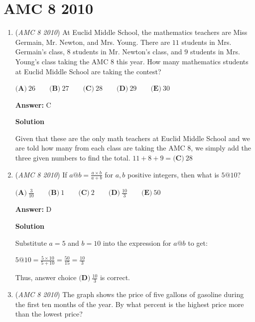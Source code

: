 \section{AMC 8 2010}
        \begin{enumerate}
        	\item (\textit{AMC 8 2010}) At Euclid Middle School, the mathematics teachers are Miss Germain, Mr. Newton, and Mrs. Young. There are $11$ students in Mrs. Germain's class, $8$ students in Mr. Newton's class, and $9$ students in Mrs. Young's class taking the AMC 8 this year. How many mathematics students at Euclid Middle School are taking the contest? 


 $\textbf{(A)}\ 26 \qquad\textbf{(B)}\ 27\qquad\textbf{(C)}\ 28\qquad\textbf{(D)}\ 29\qquad\textbf{(E)}\ 30$

 \textbf{Answer: }C



\textbf{Solution}

Given that these are the only math teachers at Euclid Middle School and we are told how many from each class are taking the AMC 8, we simply add the three given numbers to find the total. $11+8+9=\boxed{\textbf{(C)}\ 28}$



	\item (\textit{AMC 8 2010}) If $a @ b = \frac{a\times b}{a+b}$ for $a,b$ positive integers, then what is $5 @ 10$? 


 $\textbf{(A)}\ \frac{3}{10} \qquad\textbf{(B)}\ 1 \qquad\textbf{(C)}\ 2 \qquad\textbf{(D)}\ \frac{10}{3} \qquad\textbf{(E)}\ 50$

 \textbf{Answer: }D



\textbf{Solution}

Substitute $a=5$ and $b=10$ into the expression for $a @ b$ to get:

 $5 @ 10 = \frac{5\times 10}{5+10} = \frac{50}{15} = \frac{10}{3}$

 Thus, answer choice $\boxed{\textbf{(D)}\ \frac{10}{3}}$ is correct.

 


 


	\item (\textit{AMC 8 2010}) The graph shows the price of five gallons of gasoline during the first ten months of the year. By what percent is the highest price more than the lowest price?



\end{enumerate}
